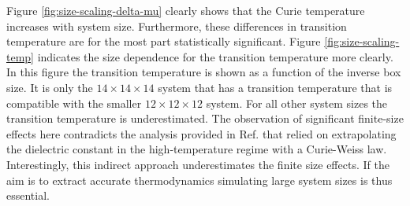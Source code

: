 Figure \ref{fig:size-scaling-delta-mu} clearly shows that the Curie temperature increases with system size.  Furthermore, these differences in transition temperature are for the most part statistically significant.  Figure \ref{fig:size-scaling-temp} indicates the size dependence for the transition temperature more clearly.  In this figure the transition temperature is shown as a function of the inverse box size.  It is only the $14\times14\times14$ system that has a transition temperature that is compatible with the smaller  $12\times12\times12$ system.  For all other system sizes the transition temperature is  underestimated. The observation of significant finite-size effects here contradicts the analysis provided in Ref. \cite{gigli_thermodynamics_2022} that relied on extrapolating the dielectric constant in the high-temperature regime with a Curie-Weiss law. Interestingly, this indirect approach underestimates the finite size effects. If the aim is to extract accurate thermodynamics simulating large system sizes is thus essential.




